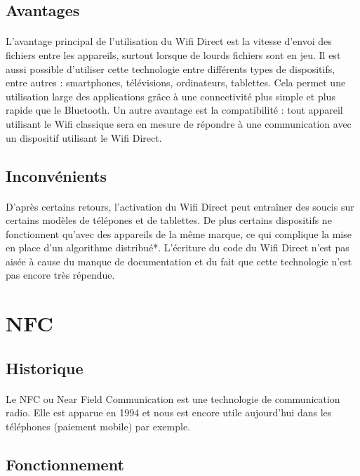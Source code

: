\documentclass[a4paper,10pt]{report}
\begin{document}
    \subsection{Avantages}
     \paragraph{}
     L'avantage principal de l'utilisation du Wifi Direct est la vitesse d'envoi des fichiers entre les appareils, surtout lorsque de lourds fichiers sont en jeu. 
     Il est aussi possible d'utiliser cette technologie entre différents types de dispositifs, entre autres : smartphones, télévisions, ordinateurs, tablettes. Cela permet une utilisation large des applications grâce à une connectivité plus simple et plus rapide que le Bluetooth. Un autre avantage est la compatibilité : tout appareil utilisant le Wifi classique sera en mesure de répondre à une communication avec un dispositif utilisant le Wifi Direct.
    \subsection{Inconvénients}
    \paragraph{}
    D'après certains retours, l'activation du Wifi Direct peut entraîner des soucis sur certains modèles de télépones et de tablettes. De plus certains dispositifs ne fonctionnent qu'avec des appareils de la même marque, ce qui complique la mise en place d'un algorithme distribué*.
    L'écriture du code du Wifi Direct n'est pas aisée à cause du manque de documentation et du fait que cette technologie n'est pas encore très répendue.
  \section{NFC}
    \subsection{Historique}
     \paragraph{}
     Le NFC ou Near Field Communication est une technologie de communication radio. Elle est apparue en 1994 et nous est encore utile aujourd'hui dans les téléphones (paiement mobile) par exemple.
    \subsection{Fonctionnement}
\end{document}
